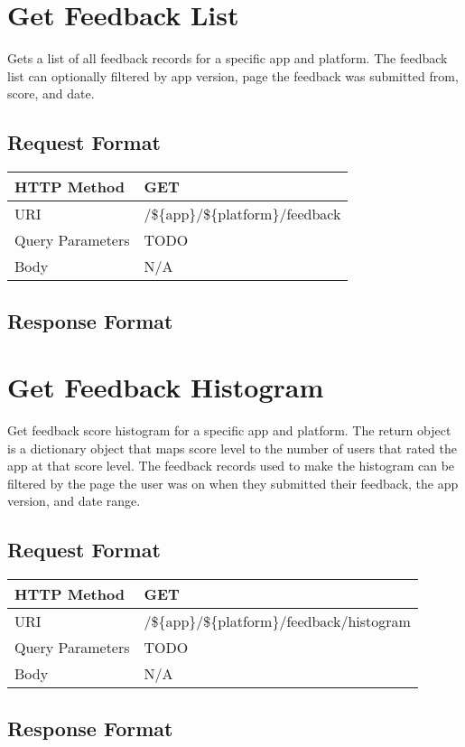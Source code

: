 \section{Get Feedback List}

Gets a list of all feedback records for a specific app and platform. The
feedback list can optionally filtered by app version, page the feedback was
submitted from, score, and date.

\subsection{Request Format}

\begin{center}
\begin{tabular}{|l||l|}
\hline
HTTP Method & GET           \\
\hline
URI         & /\$\{app\}/\$\{platform\}/feedback \\
\hline
Query Parameters & TODO           \\
\hline
Body        & N/A           \\
\hline
\end{tabular}
\end{center}

\subsection{Response Format}

\section{Get Feedback Histogram}

Get feedback score histogram for a specific app and platform. The return object
is a dictionary object that maps score level to the number of users that
rated the app at that score level. The feedback records used to make the
histogram can be filtered by the page the user was on when they submitted
their feedback, the app version, and date range.

\subsection{Request Format}

\begin{center}
\begin{tabular}{|l||l|}
\hline
HTTP Method & GET           \\
\hline
URI         & /\$\{app\}/\$\{platform\}/feedback/histogram \\
\hline
Query Parameters & TODO           \\
\hline
Body        & N/A           \\
\hline
\end{tabular}
\end{center}

\subsection{Response Format}
